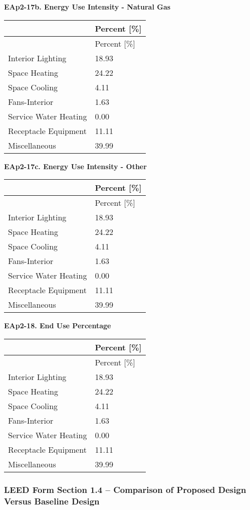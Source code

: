 \textbf{EAp2-17b. Energy Use Intensity - Natural Gas}

\begin{longtable}[c]{@{}ll@{}}
\toprule 
 & Percent [\%] \tabularnewline
\midrule
\endfirsthead

\toprule 
 & Percent [\%] \tabularnewline
\midrule
\endhead

Interior Lighting & 18.93 \tabularnewline
Space Heating & 24.22 \tabularnewline
Space Cooling & 4.11 \tabularnewline
Fans-Interior & 1.63 \tabularnewline
Service Water Heating & 0.00 \tabularnewline
Receptacle Equipment & 11.11 \tabularnewline
Miscellaneous & 39.99 \tabularnewline
\bottomrule
\end{longtable}

\textbf{EAp2-17c. Energy Use Intensity - Other}

\begin{longtable}[c]{@{}ll@{}}
\toprule 
 & Percent [\%] \tabularnewline
\midrule
\endfirsthead

\toprule 
 & Percent [\%] \tabularnewline
\midrule
\endhead

Interior Lighting & 18.93 \tabularnewline
Space Heating & 24.22 \tabularnewline
Space Cooling & 4.11 \tabularnewline
Fans-Interior & 1.63 \tabularnewline
Service Water Heating & 0.00 \tabularnewline
Receptacle Equipment & 11.11 \tabularnewline
Miscellaneous & 39.99 \tabularnewline
\bottomrule
\end{longtable}

\textbf{EAp2-18. End Use Percentage}

\begin{longtable}[c]{@{}ll@{}}
\toprule 
 & Percent [\%] \tabularnewline
\midrule
\endfirsthead

\toprule 
 & Percent [\%] \tabularnewline
\midrule
\endhead

Interior Lighting & 18.93 \tabularnewline
Space Heating & 24.22 \tabularnewline
Space Cooling & 4.11 \tabularnewline
Fans-Interior & 1.63 \tabularnewline
Service Water Heating & 0.00 \tabularnewline
Receptacle Equipment & 11.11 \tabularnewline
Miscellaneous & 39.99 \tabularnewline
\bottomrule
\end{longtable}

\subsubsection{LEED Form Section 1.4 -- Comparison of Proposed Design Versus Baseline Design}\label{leed-form-section-1.4-comparison-of-proposed-design-versus-baseline-design}

